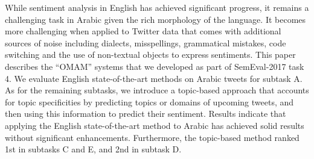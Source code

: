 While sentiment analysis in English has achieved significant progress, it remains a challenging task in Arabic given the rich morphology of the language. It becomes more challenging when applied to Twitter data that comes with additional sources of noise including dialects, misspellings, grammatical mistakes, code switching and the use of non-textual objects to express sentiments. This paper describes the ``OMAM'' systems that we developed as part of SemEval-2017 task 4. We evaluate English state-of-the-art methods on Arabic tweets for subtask A. As for the remaining subtasks, we introduce a topic-based approach that accounts for topic specificities by predicting topics or domains of upcoming tweets, and then using this information to predict their sentiment. Results indicate that applying the English state-of-the-art method to Arabic has achieved solid results without significant enhancements. Furthermore, the topic-based method ranked 1st in subtasks C and E, and 2nd in subtask D.
